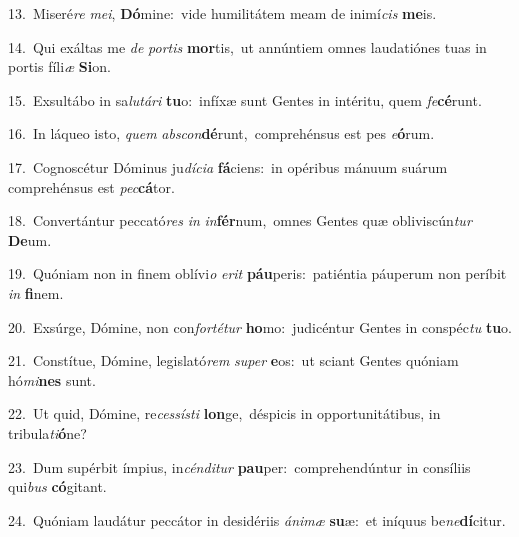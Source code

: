 {\numbfont\textcolor{\numbcolor}{13.}}~Miseré\textit{re} \textit{me}\-\textit{i}, \textbf{Dó}\-mine:~\star vide humilitátem meam de inimí\textit{cis} \textbf{me}\-is.\par
{\numbfont\textcolor{\numbcolor}{14.}}~Qui exáltas me \textit{de} \textit{por}\-\textit{tis} \textbf{mor}\-tis,~\star ut annúntiem omnes laudatiónes tuas in portis fíli\textit{æ} \textbf{Si}\-on.\par
{\numbfont\textcolor{\numbcolor}{15.}}~Exsultábo in sa\-\textit{lu}\-\textit{tá}\textit{ri} \textbf{tu}\-o:~\star infíxæ sunt Gentes in intéritu, quem \textit{fe}\-\textbf{cé}runt.\par
{\numbfont\textcolor{\numbcolor}{16.}}~In láqueo isto, \textit{quem} \textit{abs}\-\textit{con}\textbf{dé}runt,~\star comprehénsus est pes \textit{e}\-\textbf{ó}rum.\par
{\numbfont\textcolor{\numbcolor}{17.}}~Cognoscétur Dóminus ju\-\textit{dí}\-\textit{ci}\textit{a} \textbf{fá}\-ciens:~\star in opéribus mánuum suárum comprehénsus est \textit{pec}\-\textbf{cá}tor.\par
{\numbfont\textcolor{\numbcolor}{18.}}~Convertántur peccató\textit{res} \textit{in} \textit{in}\-\textbf{fér}num,~\star omnes Gentes quæ obliviscún\textit{tur} \textbf{De}\-um.\par
{\numbfont\textcolor{\numbcolor}{19.}}~Quóniam non in finem oblívi\textit{o} \textit{e}\-\textit{rit} \textbf{páu}\-peris:~\star patiéntia páuperum non períbit \textit{in} \textbf{fi}\-nem.\par
{\numbfont\textcolor{\numbcolor}{20.}}~Exsúrge, Dómine, non con\-\textit{for}\-\textit{té}\textit{tur} \textbf{ho}\-mo:~\star judicéntur Gentes in conspéc\textit{tu} \textbf{tu}\-o.\par
{\numbfont\textcolor{\numbcolor}{21.}}~Constítue, Dómine, legislató\textit{rem} \textit{su}\-\textit{per} \textbf{e}\-os:~\star ut sciant Gentes quóniam hó\-\textit{mi}\-\textbf{nes} sunt.\par
{\numbfont\textcolor{\numbcolor}{22.}}~Ut quid, Dómine, re\-\textit{ces}\-\textit{sís}\textit{ti} \textbf{lon}\-ge,~\star déspicis in opportunitátibus, in tribula\-\textit{ti}\-\textbf{ó}ne?\par
{\numbfont\textcolor{\numbcolor}{23.}}~Dum supérbit ímpius, in\-\textit{cén}\-\textit{di}\textit{tur} \textbf{pau}\-per:~\star comprehendúntur in consíliis qui\textit{bus} \textbf{có}\-gitant.\par
{\numbfont\textcolor{\numbcolor}{24.}}~Quóniam laudátur peccátor in desidériis \textit{á}\-\textit{ni}\textit{mæ} \textbf{su}\-æ:~\star et iníquus be\-\textit{ne}\-\textbf{dí}citur.\par
